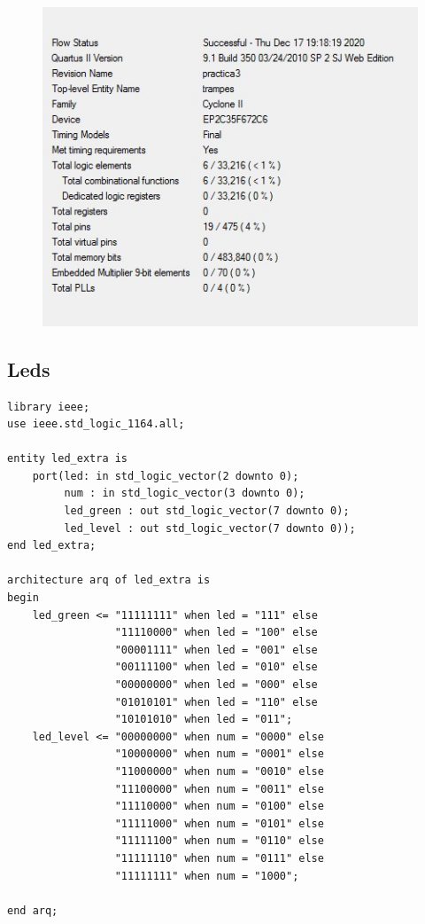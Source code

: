 \documentclass[12pt, a4papre]{article}
\begin{document}
			\begin{figure}[H]
			
				\begin{center}
		\includegraphics[width=130mm]{informeTrampes.jpeg}
		\end{center}
	\end{figure}	

			
			
\subsection{Leds}

	\begin{lstlisting}[style=vhdl, frame=single, basicstyle=\tiny]
	library ieee;
use ieee.std_logic_1164.all;

entity led_extra is
	port(led: in std_logic_vector(2 downto 0);
		 num : in std_logic_vector(3 downto 0);
		 led_green : out std_logic_vector(7 downto 0);
		 led_level : out std_logic_vector(7 downto 0));
end led_extra;

architecture arq of led_extra is
begin
	led_green <= "11111111" when led = "111" else
				 "11110000" when led = "100" else
				 "00001111" when led = "001" else
				 "00111100" when led = "010" else
				 "00000000" when led = "000" else
				 "01010101" when led = "110" else
				 "10101010" when led = "011";
	led_level <= "00000000" when num = "0000" else
				 "10000000" when num = "0001" else
				 "11000000" when num = "0010" else
				 "11100000" when num = "0011" else
				 "11110000" when num = "0100" else
				 "11111000" when num = "0101" else
				 "11111100" when num = "0110" else
				 "11111110" when num = "0111" else
				 "11111111" when num = "1000";
				 
end arq;
	\end{lstlisting}
	
\end{document}
